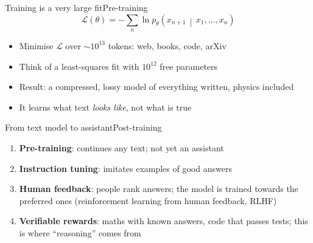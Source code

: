 \begin{frame}{Training is a very large fit}{Pre-training}
  \begin{equation*}
    \mathcal{L}(\theta) = -\sum_{n} \ln p_\theta\left(x_{n+1} \,\middle|\, x_1, \ldots, x_n\right)
  \end{equation*}

  \begin{itemize}
    \item Minimise $\mathcal{L}$ over $\sim 10^{13}$ tokens: web, books, code, arXiv
    \item<2-> Think of a least-squares fit with $10^{12}$ free parameters
    \item<3-> Result: a compressed, lossy model of everything written, physics included
    \item<4-> It learns what text \emph{looks like}, not what is true
  \end{itemize}
\end{frame}

\begin{frame}{From text model to assistant}{Post-training}
  \begin{enumerate}
    \item \textbf{Pre-training}: continues any text; not yet an assistant
    \item<2-> \textbf{Instruction tuning}: imitates examples of good answers
    \item<3-> \textbf{Human feedback}: people rank answers; the model is trained
          towards the preferred ones (reinforcement learning from human feedback, RLHF)
    \item<4-> \textbf{Verifiable rewards}: maths with known answers, code that passes
          tests; this is where ``reasoning'' comes from
  \end{enumerate}

  \vspace{2ex}
\end{frame}

